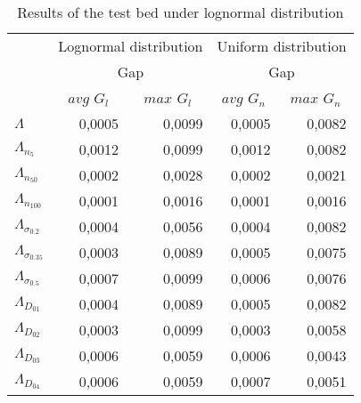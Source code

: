 \documentclass[preprint,12pt]{elsarticle}
\begin{document}
\begin{table}[htbp]
  \centering
  \caption{Results of the test bed under lognormal distribution}
    \begin{tabular}{lrrrr}
    \toprule
          & \multicolumn{2}{c}{Lognormal distribution} & \multicolumn{2}{c}{Uniform distribution} \\
          & \multicolumn{2}{c}{Gap} & \multicolumn{2}{c}{Gap} \\
          & \multicolumn{1}{c}{$avg$ $G_{l}$} & \multicolumn{1}{c}{$max$ $G_{l}$} & \multicolumn{1}{c}{$avg$ $G_{n}$} & \multicolumn{1}{c}{$max$ $G_{n}$} \\
    \midrule
     $\Lambda$  & 0,0005 & 0,0099 & 0,0005 & 0,0082 \\
     $\Lambda_{n_{5}}$ & 0,0012 & 0,0099 & 0,0012 & 0,0082 \\
    $\Lambda_{n_{50}}$ & 0,0002 & 0,0028 & 0,0002 & 0,0021 \\
    $\Lambda_{n_{100}}$ & 0,0001 & 0,0016 & 0,0001 & 0,0016 \\
    $\Lambda_{\sigma_{0.2}}$ & 0,0004 & 0,0056 & 0,0004 & 0,0082 \\
    $\Lambda_{\sigma_{0.35}}$ & 0,0003 & 0,0089 & 0,0005 & 0,0075 \\
   $\Lambda_{\sigma_{0.5}}$ & 0,0007 & 0,0099 & 0,0006 & 0,0076 \\
   $\Lambda_{D_{01}}$ & 0,0004 & 0,0089 & 0,0005 & 0,0082 \\
   $\Lambda_{D_{02}}$ & 0,0003 & 0,0099 & 0,0003 & 0,0058 \\
   $\Lambda_{D_{03}}$  & 0,0006 & 0,0059 & 0,0006 & 0,0043 \\
    $\Lambda_{D_{04}}$  & 0,0006 & 0,0059 & 0,0007 & 0,0051 \\
    \bottomrule
    \end{tabular}%
  \label{generalapptable}%
\end{table}%
\end{document}
